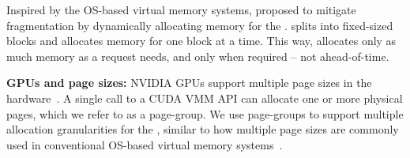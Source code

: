 Inspired by the OS-based virtual memory systems, \vllm proposed \pa to mitigate fragmentation by dynamically allocating memory for the \kvcache. \pa splits \kvcache into fixed-sized blocks and allocates memory for one block at a time. This way, \vllm allocates only as much memory as a request needs, and only when required -- not ahead-of-time.
 

\noindent
\textbf{GPUs and page sizes:} NVIDIA GPUs support multiple page sizes in the hardware~\cite{mcmgpus,gpu-mismanaged,gpu-reverse-engg-tlb1,pascalmmu}. A single call to a CUDA VMM API can allocate one or more physical pages, which we refer to as a page-group. We use page-groups to support multiple allocation granularities for the \kvcache, similar to how multiple page sizes are commonly used in conventional OS-based virtual memory systems~\cite{ingens,hawkeye}.
